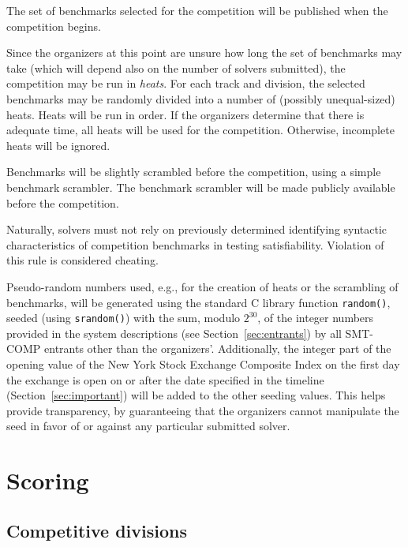 \documentclass[12pt]{article}
\begin{document}
The set of benchmarks selected for the competition will be published
when the competition begins.

%
Since the organizers at this point are unsure how long the set of
benchmarks may take (which will depend also on the number of solvers
submitted), the competition may be run in \emph{heats}.  For each
track and division, the selected benchmarks may be randomly divided
into a number of (possibly unequal-sized) heats.  Heats will be run in
order.  If the organizers determine that there is adequate time, all
heats will be used for the competition.  Otherwise, incomplete heats
will be ignored.

%
Benchmarks will be slightly scrambled before the competition, using a
simple benchmark scrambler.  The benchmark scrambler will be made
publicly available before the competition.

Naturally, solvers must not rely on previously determined identifying
syntactic characteristics of competition benchmarks in testing
satisfiability.  Violation of this rule is considered cheating.

%
Pseudo-random numbers used, e.g., for the creation of heats or the
scrambling of benchmarks, will be generated using the standard C
library function \texttt{random()}, seeded (using \texttt{srandom()})
with the sum, modulo $2^{30}$, of the integer numbers provided in the
system descriptions (see Section~\ref{sec:entrants}) by all SMT-COMP
entrants other than the organizers'.  Additionally, the integer part
of the opening value of the New York Stock Exchange Composite Index on
the first day the exchange is open on or after the date specified in
the timeline (Section~\ref{sec:important}) will be added to the other
seeding values.  This helps provide transparency, by guaranteeing that
the organizers cannot manipulate the seed in favor of or against any
particular submitted solver.


\section{Scoring}
\label{sec:scoring}

\subsection{Competitive divisions}
  
\end{document}
